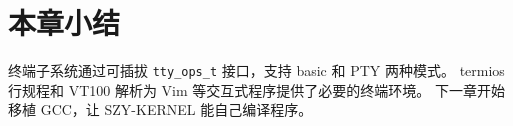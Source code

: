 
\section{本章小结}

终端子系统通过可插拔 \texttt{tty\_ops\_t} 接口，支持 basic 和 PTY 两种模式。
termios 行规程和 VT100 解析为 Vim 等交互式程序提供了必要的终端环境。
下一章开始移植 GCC，让 SZY-KERNEL 能自己编译程序。
